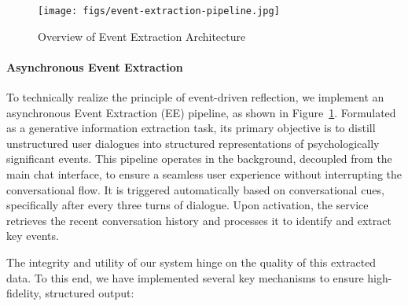 \begin{figure}[!b]
    \centering
    \texttt{[image: figs/event-extraction-pipeline.jpg]}
    \caption{Overview of Event Extraction Architecture}
    \label{fig:event-pipeline}
\end{figure}

\paragraph{Asynchronous Event Extraction}

To technically realize the principle of event-driven reflection, we implement an asynchronous Event Extraction (EE) pipeline, as shown in Figure~\ref{fig:event-pipeline}. Formulated as a generative information extraction task\cite{xu2023large}, its primary objective is to distill unstructured user dialogues into structured representations of psychologically significant events. This pipeline operates in the background, decoupled from the main chat interface, to ensure a seamless user experience without interrupting the conversational flow. It is triggered automatically based on conversational cues, specifically after every three turns of dialogue. Upon activation, the service retrieves the recent conversation history and processes it to identify and extract key events.

The integrity and utility of our system hinge on the quality of this extracted data. To this end, we have implemented several key mechanisms to ensure high-fidelity, structured output:

